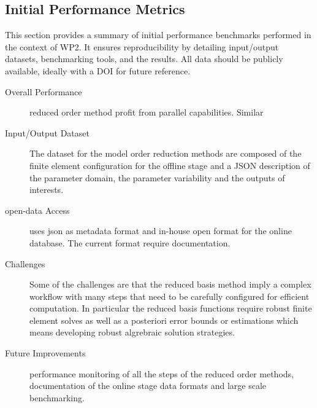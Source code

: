 \subsection{Initial Performance Metrics}
\label{sec:WP2:Feelpp:metrics}

This section provides a summary of initial performance benchmarks performed in the context of WP2. It ensures reproducibility by detailing input/output datasets, benchmarking tools, and the results. All data should be publicly available, ideally with a DOI for future reference.

\begin{description}
    \item[Overall Performance] \Feelpp reduced order method profit from \Feelpp parallel capabilities. Similar
    \item[Input/Output Dataset] The dataset for the \Feelpp model order reduction methods are composed of the finite element configuration for the offline stage and a  JSON description of the parameter domain, the parameter variability and the outputs of interests.
    \item[open-data Access] \Feelpp uses json as metadata format and in-house open format for the online database. The current format require documentation.
    \item[Challenges] Some of the challenges are that the reduced basis method imply a complex workflow with many steps that need to be carefully configured for efficient computation. In particular the reduced basis functions require  robust finite element solves as well as a posteriori error bounds or estimations which means developing robust algrebraic solution strategies.
    \item[Future Improvements] performance monitoring of all the steps of the reduced order methods, documentation of the online stage data formats and large scale benchmarking.
\end{description}



